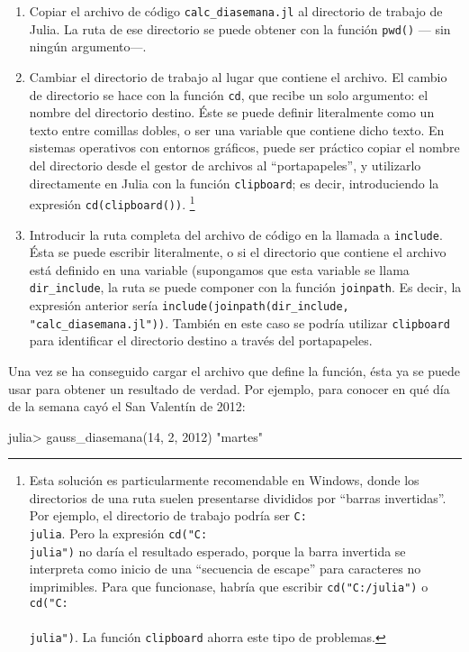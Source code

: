﻿\documentclass{article}
\newcommand{\code}{\texttt}
\begin{document}
\begin{enumerate}
  \item Copiar el archivo de código \code{calc_diasemana.jl} al directorio de trabajo de Julia. La ruta de ese directorio se puede obtener con la función \code{pwd()} --- sin ningún argumento---.
  \item Cambiar el directorio de trabajo al lugar que contiene el archivo. El cambio de directorio se hace con la función \code{cd}, que recibe un solo argumento: el nombre del directorio destino. Éste se puede definir literalmente como un texto entre comillas dobles, o ser una variable que contiene dicho texto. En sistemas operativos con entornos gráficos, puede ser práctico copiar el nombre del directorio desde el gestor de archivos al ``portapapeles'', y utilizarlo directamente en Julia con la función \code{clipboard}; es decir, introduciendo la expresión \code{cd(clipboard())}.%
  \footnote{%
  Esta solución es particularmente recomendable en Windows, donde los directorios de una ruta suelen presentarse divididos por ``barras invertidas''. Por ejemplo, el directorio de trabajo podría ser \texttt{C:\\julia}. Pero la expresión \code{cd("C:\\julia")} no daría el resultado esperado, porque la barra invertida se interpreta como inicio de una ``secuencia de escape'' para caracteres no imprimibles. Para que funcionase, habría que escribir \code{cd("C:/julia")} o \code{cd("C:\\\\julia")}. La función \code{clipboard} ahorra este tipo de problemas.%
  }
  \item Introducir la ruta completa del archivo de código en la llamada a \code{include}. Ésta se puede escribir literalmente, o si el directorio que contiene el archivo está definido en una variable (supongamos que esta variable se llama \code{dir_include}, la ruta se puede componer con la función \code{joinpath}. Es decir, la expresión anterior sería \code{include(joinpath(dir_include, "calc_diasemana.jl"))}. También en este caso se podría utilizar \code{clipboard} para identificar el directorio destino a través del portapapeles.
\end{enumerate}

Una vez se ha conseguido cargar el archivo que define la función, ésta ya se puede usar para obtener un resultado de verdad. Por ejemplo, para conocer en qué día de la semana cayó el San Valentín de 2012:

julia> gauss_diasemana(14, 2, 2012)
"martes"
\end{document}
